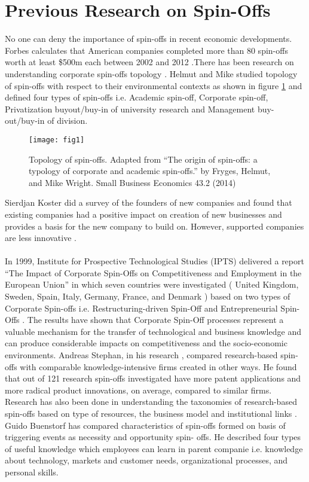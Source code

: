 \section{Previous Research on Spin-Offs\label{sec:previous_r_spin}}
No one can deny the importance of spin-offs in recent economic developments. Forbes calculates
that American companies completed more than 80 spin-offs worth at least \$500m each between
2002 and 2012 \cite{12}.There has been research on understanding corporate spin-offs topology \cite{23}. 
Helmut and Mike \cite{24} studied topology of spin-offs with respect to their environmental contexts as
shown in figure \ref{fig1} and defined four types of spin-offs i.e. Academic spin-off, Corporate spin-off,
Privatization buyout/buy-in of university research and Management buy-out/buy-in of division.

\begin{figure}[htb]
	\centering
	\texttt{[image: fig1]}
	\caption{Topology of spin-offs. Adapted from ``The origin of spin-offs: a typology of corporate and academic spin-offs.'' by Fryges, Helmut, and Mike Wright. Small Business Economics 43.2 (2014)}
	\label{fig1}
\end{figure}

Sierdjan Koster did a survey of the founders of new companies and found that existing companies
had a positive impact on creation of new businesses and provides a basis for the new company to
build on. However, supported companies are less innovative \cite{50}.
\\
\\
In 1999, Institute for Prospective Technological Studies (IPTS) delivered a report ``The Impact of
Corporate Spin-Offs on Competitiveness and Employment in the European Union'' in which seven
countries were investigated ( United Kingdom, Sweden, Spain, Italy, Germany, France, and
Denmark ) based on two types of Corporate Spin-offs i.e. Restructuring-driven Spin-Off and
Entrepreneurial Spin-Offs \cite{26}. The results have shown that Corporate Spin-Off processes represent
a valuable mechanism for the transfer of technological and business knowledge and can produce
considerable impacts on competitiveness and the socio-economic environments. Andreas Stephan,
in his research \cite{22}, compared research-based spin-offs with comparable knowledge-intensive firms
created in other ways. He found that out of 121 research spin-offs investigated have more patent
applications and more radical product innovations, on average, compared to similar firms.
Research has also been done in understanding the taxonomies of research-based spin-offs based on
type of resources, the business model and institutional links \cite{27}. Guido Buenstorf \cite{28} has compared
characteristics of spin-offs formed on basis of triggering events as necessity and opportunity spin-
offs. He described four types of useful knowledge which employees can learn in parent
companie i.e. knowledge about technology, markets and customer needs, organizational
processes, and personal skills.

